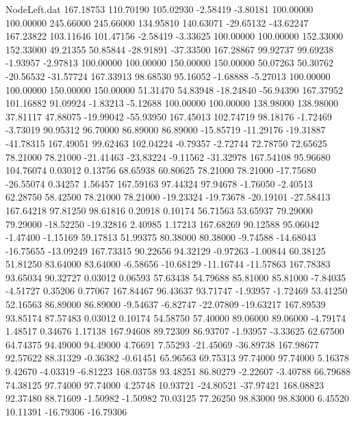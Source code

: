 \begin{filecontents}{NodeLeft.dat}
 167.18753  110.70190  105.02930    -2.58419   -3.80181  100.00000  100.00000  245.66000  245.66000  134.95810  140.63071  -29.65132  -43.62247
 167.23822  103.11646  101.47156    -2.58419   -3.33625  100.00000  100.00000  152.33000  152.33000   49.21355   50.85844  -28.91891  -37.33500
 167.28867   99.92737   99.69238    -1.93957   -2.97813  100.00000  100.00000  150.00000  150.00000   50.07263   50.30762  -20.56532  -31.57724
 167.33913   98.68530   95.16052    -1.68888   -5.27013  100.00000  100.00000  150.00000  150.00000   51.31470   54.83948  -18.24840  -56.94390
 167.37952  101.16882   91.09924    -1.83213   -5.12688  100.00000  100.00000  138.98000  138.98000   37.81117   47.88075  -19.99042  -55.93950
 167.45013  102.74719   98.18176    -1.72469   -3.73019   90.95312   96.70000   86.89000   86.89000  -15.85719  -11.29176  -19.31887  -41.78315
 167.49051   99.62463  102.04224    -0.79357   -2.72744   72.78750   72.65625   78.21000   78.21000  -21.41463  -23.83224   -9.11562  -31.32978
 167.54108   95.96680  104.76074     0.03012    0.13756   68.65938   60.80625   78.21000   78.21000  -17.75680  -26.55074    0.34257    1.56457
 167.59163   97.44324   97.94678    -1.76050   -2.40513   62.28750   58.42500   78.21000   78.21000  -19.23324  -19.73678  -20.19101  -27.58413
 167.64218   97.81250   98.61816     0.20918    0.10174   56.71563   53.65937   79.29000   79.29000  -18.52250  -19.32816    2.40985    1.17213
 167.68269   90.12588   95.06042    -1.47400   -1.15169   59.17813   51.99375   80.38000   80.38000   -9.74588  -14.68043  -16.75655  -13.09249
 167.73315   90.22656   94.32129    -0.97263   -1.00844   60.38125   51.81250   83.64000   83.64000   -6.58656  -10.68129  -11.16744  -11.57863
 167.78383   93.65034   90.32727     0.03012    0.06593   57.63438   54.79688   85.81000   85.81000   -7.84035   -4.51727    0.35206    0.77067
 167.84467   96.43637   93.71747    -1.93957   -1.72469   53.41250   52.16563   86.89000   86.89000   -9.54637   -6.82747  -22.07809  -19.63217
 167.89539   93.85174   87.57483     0.03012    0.10174   54.58750   57.40000   89.06000   89.06000   -4.79174    1.48517    0.34676    1.17138
 167.94608   89.72309   86.93707    -1.93957   -3.33625   62.67500   64.74375   94.49000   94.49000    4.76691    7.55293  -21.45069  -36.89738
 167.98677   92.57622   88.31329    -0.36382   -0.61451   65.96563   69.75313   97.74000   97.74000    5.16378    9.42670   -4.03319   -6.81223
 168.03758   93.48251   86.80279    -2.22607   -3.40788   66.79688   74.38125   97.74000   97.74000    4.25748   10.93721  -24.80521  -37.97421
 168.08823   92.37480   88.71609    -1.50982   -1.50982   70.03125   77.26250   98.83000   98.83000    6.45520   10.11391  -16.79306  -16.79306

\end{filecontents}
